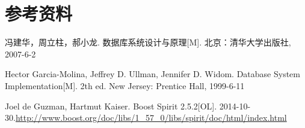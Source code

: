 \section{参考资料}
\begin{enumerate}[ label={[\arabic*]} ]
\item
冯建华，周立柱，郝小龙. 数据库系统设计与原理[M]. 北京：清华大学出版社, 2007-6-2
\item
Hector Garcia-Molina, Jeffrey D. Ullman, Jennifer D. Widom. Database System Implementation[M]. 2th ed. New Jersey: Prentice Hall, 1999-6-11
\item
Joel de Guzman, Hartmut Kaiser. Boost Spirit 2.5.2[OL]. 2014-10-30.\url{http://www.boost.org/doc/libs/1\_57\_0/libs/spirit/doc/html/index.html}


\end{enumerate}


